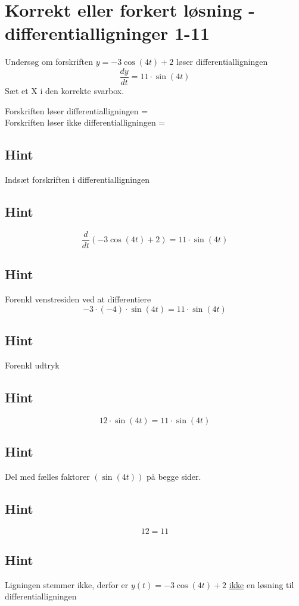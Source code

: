 \documentclass{article}
\newenvironment{exercise}[1]{\newpage\section{#1}}{}
\newcommand{\answerbox}[1]{\fbox{$#1$}}
\newcommand{\hint}{\subsection*{Hint}}
\begin{document}
\begin{exercise}{Korrekt eller forkert løsning - differentialligninger 1-11}
	
	
	Undersøg om forskriften $y =  -3 \cos(4t) + 2$ løser differentialligningen
	\[
	\frac{dy}{dt} = 11 \cdot \sin(4t)
	\]
	Sæt et X i den korrekte svarbox.
	
	Forskriften løser differentialligningen = \answerbox{} \\
	
	Forskriften løser ikke differentialligningen = \answerbox{X}
	
	\hint
	
	Indsæt forskriften i differentialligningen
	
	\hint
	\[
	\frac{d}{dt} \left(-3 \cos(4t) + 2\right) = 11 \cdot \sin(4t)
	\]
	
	
	\hint
	
	Forenkl venstresiden ved at differentiere
	\[
	-3 \cdot (-4) \cdot \sin(4t) = 11 \cdot \sin(4t)
	\]
	
	\hint
	
	Forenkl udtryk
	
	\hint
	\[
	12 \cdot \sin(4t) = 11 \cdot \sin(4t)
	\]
	
	\hint
	Del med fælles faktorer $\left(\sin(4t) \right)$ på begge sider.
	
	\hint
	
	\[
	12 = 11
	\]
	
	
	\hint
	
	Ligningen stemmer ikke, derfor er $y(t) = -3 \cos(4t) + 2$ \underline{ikke} en løsning til differentialligningen
	
\end{exercise}

\newpage
\end{document}
